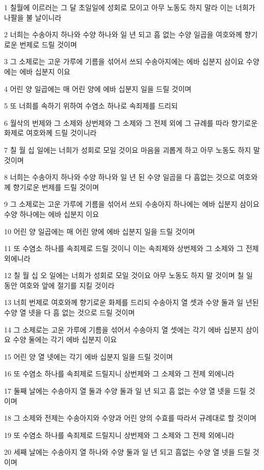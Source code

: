\par 1 칠월에 이르러는 그 달 초일일에 성회로 모이고 아무 노동도 하지 말라 이는 너희가 나팔을 불 날이니라
\par 2 너희는 수송아지 하나와 수양 하나와 일 년 되고 흠 없는 수양 일곱을 여호와께 향기로운 번제로 드릴 것이며
\par 3 그 소제로는 고운 가루에 기름을 섞어서 쓰되 수송아지에는 에바 십분지 삼이요 수양에는 에바 십분지 이요
\par 4 어린 양 일곱에는 매 어린 양에 에바 십분지 일을 드릴 것이며
\par 5 또 너희를 속하기 위하여 수염소 하나로 속죄제를 드리되
\par 6 월삭의 번제와 그 소제와 상번제와 그 소제와 그 전제 외에 그 규례를 따라 향기로운 화제로 여호와께 드릴 것이니라
\par 7 칠 월 십 일에는 너희가 성회로 모일 것이요 마음을 괴롭게 하고 아무 노동도 하지 말 것이며
\par 8 너희는 수송아지 하나와 수양 하나와 일 년 된 수양 일곱을 다 흠없는 것으로 여호와께 향기로운 번제를 드릴 것이며
\par 9 그 소제로는 고운 가루에 기름을 섞어서 쓰되 수송아지 하나에는 에바 십분지 삼이요 수양 하나에는 에바 십분지 이요
\par 10 어린 양 일곱에는 매 어린 양에 에바 십분지 일을 드릴 것이며
\par 11 또 수염소 하나를 속죄제로 드릴 것이니 이는 속죄제와 상번제와 그 소제와 그 전제 외에니라
\par 12 칠 월 십 오 일에는 너희가 성회로 모일 것이요 아무 노동도 하지 말 것이며 칠 일 동안 여호와 앞에 절기를 지킬 것이라
\par 13 너희 번제로 여호와께 향기로운 화제를 드리되 수송아지 열 셋과 수양 둘과 일 년된 수양 열 넷을 다 흠 없는 것으로 드릴 것이며
\par 14 그 소제로는 고운 가루에 기름을 섞어서 수송아지 열 셋에는 각기 에바 십분지 삼이요 수양 둘에는 각기 에바 십분지 이요
\par 15 어린 양 열 넷에는 각기 에바 십분지 일을 드릴 것이며
\par 16 또 수염소 하나를 속죄제로 드릴지니 상번제와 그 소제와 그 전제 외에니라
\par 17 둘째 날에는 수송아지 열 둘과 수양 둘과 일 년 되고 흠 없는 수양 열 넷을 드릴 것이며
\par 18 그 소제와 전제는 수송아지와 수양과 어린 양의 수효를 따라서 규례대로 할 것이며
\par 19 또 수염소 하나를 속죄제로 드릴지니 상번제와 그 소제와 그 전제 외에니라
\par 20 세째 날에는 수송아지 열 하나와 수양 둘과 일 년 되고 흠없는 수양 열 넷을 드릴 것이며
